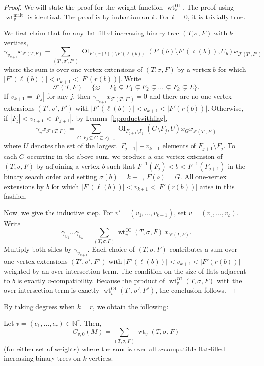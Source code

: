 \documentclass[ALCO,published]{cedram}
\numberwithin{equation}{section}
\numberwithin{figure}{section}
\newcommand{\N}{\mathbb{N}}
\newcommand{\cF}{\mathcal{F}}
\DeclareMathOperator{\OI}{OI}
\DeclareMathOperator{\mult}{mult}
\DeclareMathOperator{\wt}{wt}
\begin{document}
\begin{proof}
    We will state the proof for the weight function $\wt^{\OI}_v$. The proof using $\wt^{\mult}_v$ is identical.
    The proof is by induction on $k$. For $k=0$, it is trivially true.

    We first claim that for any flat-filled increasing binary tree $(T,\sigma,F)$ with $k$ vertices,
    \[\gamma_{v_{k+1}}x_{\cF(T,F)}=\sum_{(T',\sigma',F')} \OI_{F'(r(b))\setminus F'(\ell(b))} (F'(b) \setminus F'(\ell(b)), U_b)x_{\cF(T',F')}
    \]
    where the sum is over one-vertex extensions of $(T,\sigma,F)$ by a vertex $b$ for which $|F'(\ell(b))|<v_{k+1}<|F'(r(b))|$. 
    Write 
    \[\cF(T,F)=\{\varnothing=F_0\subsetneq F_1\subsetneq F_2\subsetneq \dots\subsetneq F_k\subsetneq E\}.\]
    If $v_{k+1}=|F_j|$ for any $j$, then $\gamma_{v_{k+1}}x_{\cF(T',F')}=0$ and there are no one-vertex extensions $(T',\sigma',F')$ with $|F'(\ell(b))|<v_{k+1}<|F'(r(b))|$.
    Otherwise,  if $|F_j|<v_{k+1}<|F_{j+1}|$, by Lemma~\ref{l:productwithflag}, 
    \[\gamma_vx_{\cF(T,F)}=\sum_{G \colon F_j \subsetneq G \subsetneq F_{j+1}}\OI_{F_{j+1}\setminus F_j} (G \setminus F_j, U)x_Gx_{\cF(T',F')}
    \]
    where $U$ denotes the set of the largest $|F_{j+1}|-v_{k+1}$ elements of $F_{j+1}\setminus F_j$.
    To each $G$ occurring in the above sum, we produce a one-vertex extension of $(T,\sigma,F)$ by adjoining a vertex $b$ such that $F^{-1}(F_j)<b<F^{-1}(F_{j+1})$ in the binary search order and setting $\sigma(b)=k+1$, $F(b)=G$. All one-vertex extensions by $b$ for which $|F'(\ell(b))|<v_{k+1}<|F'(r(b))|$ arise in this fashion.

    Now, we give the inductive step. For $v'=(v_1,\dots,v_{k+1})$, set $v=(v_1,\dots,v_k)$. Write
    \[\gamma_{v_1}\dots\gamma_{v_k}=\sum_{(T,\sigma,F)} \wt^{\OI}_v(T,\sigma,F) \, x_{\cF(T,F)}.
    \]
    Multiply both sides by $\gamma_{v_{k+1}}$. Each choice of $(T,\sigma,F)$ contributes a sum over one-vertex extensions $(T',\sigma',F')$ with $|F'(\ell(b))|<v_{k+1}<|F'(r(b))|$ weighted by an over-intersection term. The condition on the size of flats adjacent to $b$ is exactly $v$-compatibility. Because the product of $\wt^{\OI}_v(T,\sigma,F)$ with the over-intersection term is exactly $\wt^{\OI}_{v'}(T',\sigma',F')$, the conclusion follows.
 
\end{proof}

By taking degrees when $k=r$, we obtain the following:
\begin{coro} \label{c:postnikov}
    Let $v = (v_1, \ldots, v_r) \in \N^r$. Then,
    \[ C_{v,0}(M) = \sum_{(T,\sigma,F)} \wt_v(T,\sigma,F)\]
    (for either set of weights) where the sum is over all $v$-compatible flat-filled increasing binary trees on $k$ vertices.
\end{coro}
\end{document}
